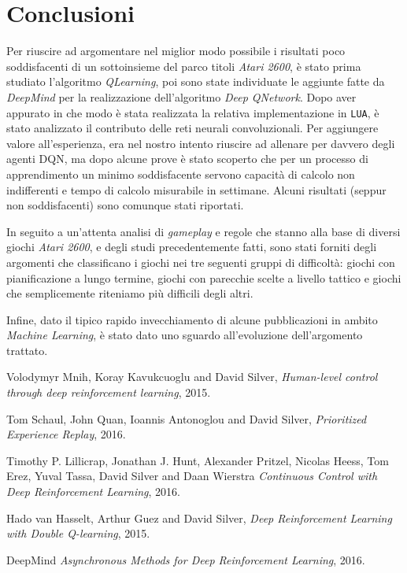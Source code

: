 \documentclass[twoside,twocolumn,10pt]{extarticle}
\theoremstyle{definition}
\begin{document}
	\section{Conclusioni}
		Per riuscire ad argomentare nel miglior modo possibile i risultati poco soddisfacenti di un sottoinsieme del parco titoli \textit{Atari 2600}, è stato prima studiato l'algoritmo \textit{Q\texttwelveudash Learning}, poi sono state individuate le aggiunte fatte da \textit{DeepMind} per la realizzazione dell'algoritmo \textit{Deep Q\texttwelveudash Network}. Dopo aver appurato in che modo è stata realizzata la relativa implementazione in \texttt{LUA}, è stato analizzato il contributo delle reti neurali convoluzionali. Per aggiungere valore all'esperienza, era nel nostro intento riuscire ad allenare per davvero degli agenti DQN, ma dopo alcune prove è stato scoperto che per un processo di apprendimento un minimo soddisfacente servono capacità di calcolo non indifferenti e tempo di calcolo misurabile in settimane. Alcuni risultati (seppur non soddisfacenti) sono comunque stati riportati.
		
		In seguito a un'attenta analisi di \textit{gameplay} e regole che stanno alla base di diversi giochi \textit{Atari 2600}, e degli studi precedentemente fatti, sono stati forniti degli argomenti che classificano i giochi nei tre seguenti gruppi di difficoltà: giochi con pianificazione a lungo termine, giochi con parecchie scelte a livello tattico e giochi che semplicemente riteniamo più difficili degli altri.
		
		Infine, dato il tipico rapido invecchiamento di alcune pubblicazioni in ambito \textit{Machine Learning}, è stato dato uno sguardo all'evoluzione dell'argomento trattato.
	
\begin{thebibliography}{99}	
		Volodymyr Mnih, Koray Kavukcuoglu and David Silver,
		\newblock \emph{Human-level control through deep reinforcement learning},
		2015.
		
		Tom Schaul, John Quan, Ioannis Antonoglou and David Silver,
		\newblock \emph{Prioritized Experience Replay},
		2016.
		
		Timothy P. Lillicrap, Jonathan J. Hunt, Alexander Pritzel, Nicolas Heess,
Tom Erez, Yuval Tassa, David Silver and Daan Wierstra
		\newblock \emph{Continuous Control with Deep Reinforcement Learning},
		2016.
		
		Hado van Hasselt, Arthur Guez and David Silver,
		\newblock \emph{Deep Reinforcement Learning with Double Q-learning},
		2015.
	
		DeepMind
		\newblock \emph{Asynchronous Methods for Deep Reinforcement Learning},
		2016.
\end{thebibliography}
\end{document}
